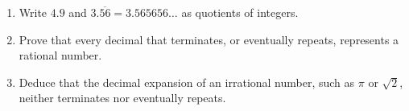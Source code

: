 \begin{enumerate}
\item[(a)] Write $4.9$ and $3.\overline{56}=3.565656\ldots$ as quotients of integers.
\item[(b)] Prove that every decimal that terminates, or eventually repeats, represents a rational number.
\item[(c)] Deduce that the decimal expansion of an irrational number, such as $\pi$ or $\sqrt2$, neither terminates nor eventually repeats.
\end{enumerate}
